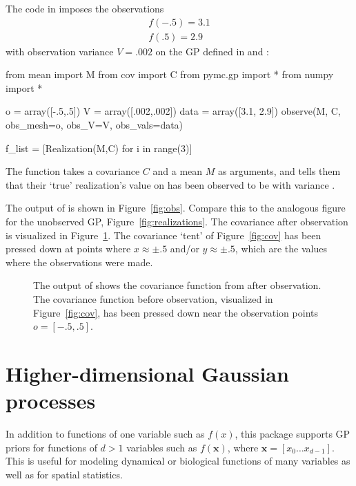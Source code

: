 \documentclass[article]{jss}
\begin{document}
The code in  imposes the observations
\begin{eqnarray*}
    f(-.5) = 3.1\\
    f(.5) = 2.9
\end{eqnarray*}
with observation variance $V=.002$ on the GP defined in  and :
\begin{CodeChunk}
\begin{CodeInput}
from mean import M
from cov import C
from pymc.gp import *
from numpy import *

o = array([-.5,.5])
V = array([.002,.002])
data = array([3.1, 2.9])
observe(M, C, obs_mesh=o, obs_V=V, obs_vals=data)

f_list = [Realization(M,C) for i in range(3)]
\end{CodeInput}
\end{CodeChunk}

The function  takes a covariance $C$ and a mean $M$ as arguments, and tells them that their `true' realization's value on  has been observed to be  with variance . 

The output of   is shown in Figure~\ref{fig:obs}. Compare this to the analogous figure for the unobserved GP, Figure~\ref{fig:realizations}. The covariance after observation is visualized in Figure~\ref{fig:obscov}. The covariance `tent' of Figure~\ref{fig:cov} has been pressed down at points where $x\approx \pm .5$ and/or $y\approx\pm .5$, which are the values where the observations were made.

\begin{figure}
    \centering
    \caption{The output of  shows the covariance function from  after observation. The covariance function before observation, visualized in Figure~\ref{fig:cov}, has been pressed down near the observation points $o=[-.5, .5]$.}
    \label{fig:obscov}
\end{figure}

\section{Higher-dimensional Gaussian processes}\label{sec:highdim}

In addition to functions of one variable such as $f(x)$, this package supports GP priors for functions of $d>1$ variables such as $f(\mathbf{x})$, where $\mathbf{x}=[x_0\ldots x_{d-1}]$. This is useful for modeling dynamical or biological functions of many variables as well as for spatial statistics.
\end{document}
